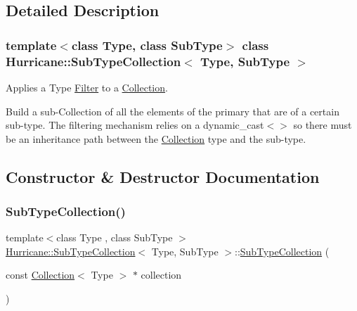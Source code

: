 \subsection{Detailed Description}
\subsubsection*{template$<$class Type, class Sub\+Type$>$\newline
class Hurricane\+::\+Sub\+Type\+Collection$<$ Type, Sub\+Type $>$}

Applies a Type \mbox{\hyperlink{classHurricane_1_1Filter}{Filter}} to a \mbox{\hyperlink{classHurricane_1_1Collection}{Collection}}. 

Build a sub-\/\+Collection of all the elements of the primary that are of a certain sub-\/type. The filtering mechanism relies on a {\ttfamily dynamic\+\_\+cast$<$$>$} so there must be an inheritance path between the \mbox{\hyperlink{classHurricane_1_1Collection}{Collection}} type and the sub-\/type. 

\subsection{Constructor \& Destructor Documentation}
\mbox{\label{classHurricane_1_1SubTypeCollection_a0fd6c8e781097e607b813306fd2ad677}} 
\subsubsection{\texorpdfstring{Sub\+Type\+Collection()}{SubTypeCollection()}\hspace{0.1cm}{\footnotesize\ttfamily [1/3]}}
{\footnotesize\ttfamily template$<$class Type , class Sub\+Type $>$ \\
\mbox{\hyperlink{classHurricane_1_1SubTypeCollection}{Hurricane\+::\+Sub\+Type\+Collection}}$<$ Type, Sub\+Type $>$\+::\mbox{\hyperlink{classHurricane_1_1SubTypeCollection}{Sub\+Type\+Collection}} (\begin{DoxyParamCaption}\item[{const \mbox{\hyperlink{classHurricane_1_1Collection}{Collection}}$<$ Type $>$ $\ast$}]{collection }\end{DoxyParamCaption})\hspace{0.3cm}{\ttfamily [inline]}}

